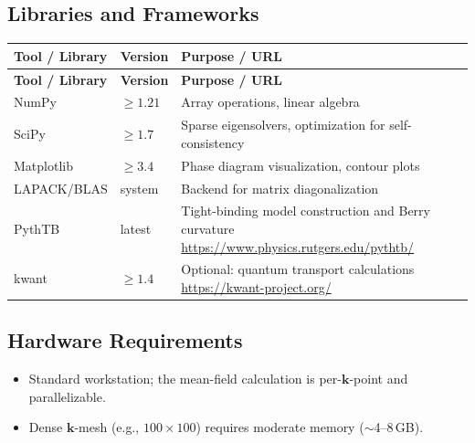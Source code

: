 \documentclass[11pt,a4paper]{article}
\begin{document}
\subsection{Libraries and Frameworks}
\begin{longtable}{p{4.5cm} p{2.5cm} p{6.5cm}}
\toprule
\textbf{Tool / Library} & \textbf{Version} & \textbf{Purpose / URL} \\
\midrule
\endfirsthead
\toprule
\textbf{Tool / Library} & \textbf{Version} & \textbf{Purpose / URL} \\
\midrule
\endhead
NumPy & $\geq 1.21$ & Array operations, linear algebra \\
\midrule
SciPy & $\geq 1.7$ & Sparse eigensolvers, optimization for self-consistency \\
\midrule
Matplotlib & $\geq 3.4$ & Phase diagram visualization, contour plots \\
\midrule
LAPACK/BLAS & system & Backend for matrix diagonalization \\
\midrule
PythTB & latest & Tight-binding model construction and Berry curvature \newline \url{https://www.physics.rutgers.edu/pythtb/} \\
\midrule
kwant & $\geq 1.4$ & Optional: quantum transport calculations \newline \url{https://kwant-project.org/} \\
\bottomrule
\end{longtable}

\subsection{Hardware Requirements}
\begin{itemize}
  \item Standard workstation; the mean-field calculation is per-$\mathbf{k}$-point and parallelizable.
  \item Dense $\mathbf{k}$-mesh (e.g., $100 \times 100$) requires moderate memory ($\sim$4--8\,GB).
\end{itemize}
\end{document}
